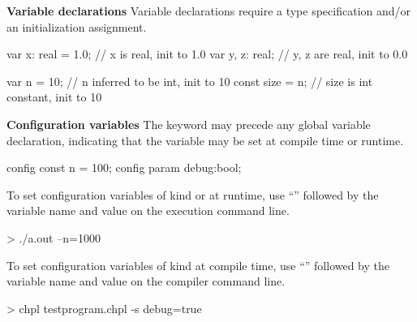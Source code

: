 \documentclass[landscape]{report}
\begin{document}
{{\bf Variable declarations} \newline
Variable declarations require a type specification and/or an 
initialization assignment.
\begin{chapel}
var x: real = 1.0; // x is real, init to 1.0
var y, z: real;    // y, z are real, init to 0.0

var n = 10;      // n inferred to be int, init to 10
const size = n;  // size is int constant, init to 10 
\end{chapel}
{\bf Configuration variables} \newline
The keyword  may precede any global variable
declaration, indicating that the variable may be set at
compile time or runtime.
\begin{chapel}
config const n = 100; 
config param debug:bool; 
\end{chapel}
To set configuration variables of kind  or  
at runtime, use ``\chpl{--}''
followed by the variable name and value on the execution
command line.
\begin{commandline}
> ./a.out --n=1000
\end{commandline}
To set configuration variables of kind  at compile time, use
``'' followed by the variable name and value on the
compiler command line.
\begin{commandline}
> chpl testprogram.chpl -s debug=true
\end{commandline}
}
\end{document}
